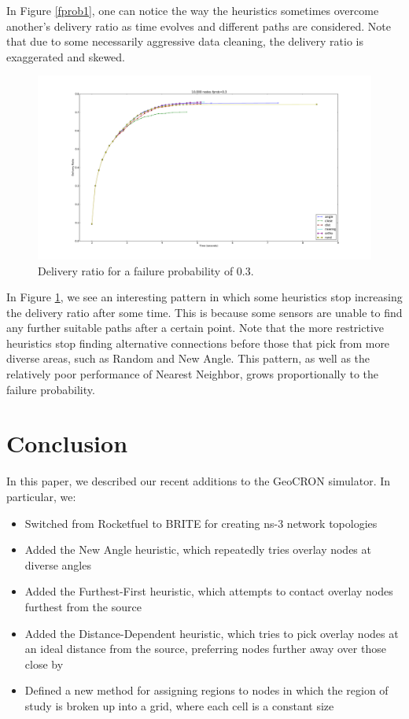\documentclass[conference]{IEEEtran}
\begin{document}
In Figure \ref{fprob1}, one can notice the way the heuristics sometimes overcome another's delivery ratio as time evolves and different paths are considered.
Note that due to some necessarily aggressive data cleaning, the delivery ratio is exaggerated and skewed.


\begin{figure}
\label{fprob3}
\includegraphics[width=6.0in]{../../images/plots/fprob3}
\vspace{-20pt}
\caption{Delivery ratio for a failure probability of 0.3.}
\end{figure}

In Figure \ref{fprob3}, we see an interesting pattern in which some heuristics stop increasing the delivery ratio after some time.
This is because some sensors are unable to find any further suitable paths after a certain point.
Note that the more restrictive heuristics stop finding alternative connections before those that pick from more diverse areas, such as Random and New Angle.
This pattern, as well as the relatively poor performance of Nearest Neighbor, grows proportionally to the failure probability.


\section{Conclusion}
In this paper, we described our recent additions to the GeoCRON simulator.
In particular, we:

\begin{itemize}
 \item Switched from Rocketfuel to BRITE for creating ns-3 network topologies
\item Added the New Angle heuristic, which repeatedly tries overlay nodes at diverse angles
\item Added the Furthest-First heuristic, which attempts to contact overlay nodes furthest from the source
\item Added the Distance-Dependent heuristic, which tries to pick overlay nodes at an ideal distance from the source, preferring nodes further away over those close by
\item Defined a new method for assigning regions to nodes in which the region of study is broken up into a grid, where each cell is a constant size
\end{itemize}
\end{document}
